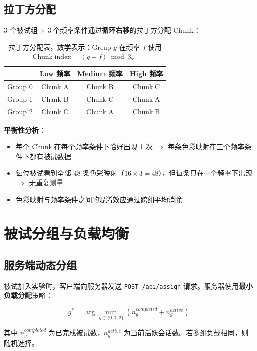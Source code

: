 \documentclass{article}
\begin{document}
\subsection{拉丁方分配}
3 个被试组 $\times$ 3 个频率条件通过\textbf{循环右移}的拉丁方分配 Chunk：

\begin{table}[H]
\centering
\begin{tabular}{lccc}
\toprule
         & Low 频率     & Medium 频率  & High 频率    \\
\midrule
Group 0  & Chunk A     & Chunk B     & Chunk C     \\
Group 1  & Chunk B     & Chunk C     & Chunk A     \\
Group 2  & Chunk C     & Chunk A     & Chunk B     \\
\bottomrule
\end{tabular}
\caption{拉丁方分配表。数学表示：Group $g$ 在频率 $f$ 使用 Chunk $\text{index} = (g + f) \bmod 3$。}
\label{tab:latin-square}
\end{table}

\textbf{平衡性分析}：
\begin{itemize}
    \item 每个 Chunk 在每个频率条件下恰好出现 1 次 $\Rightarrow$ 每条色彩映射在三个频率条件下都有被试数据
    \item 每位被试看到全部 48 条色彩映射（$16 \times 3 = 48$），但每条只在一个频率下出现 $\Rightarrow$ 无重复测量
    \item 色彩映射与频率条件之间的混淆效应通过跨组平均消除
\end{itemize}


\section{被试分组与负载均衡}

\subsection{服务端动态分组}
被试加入实验时，客户端向服务器发送 \texttt{POST /api/assign} 请求。服务器使用\textbf{最小负载分配}策略：

\begin{equation}
g^* = \arg\min_{g \in \{0, 1, 2\}} \left( n_g^{completed} + n_g^{active} \right)
\end{equation}

其中 $n_g^{completed}$ 为已完成被试数，$n_g^{active}$ 为当前活跃会话数。若多组负载相同，则随机选择。
\end{document}
